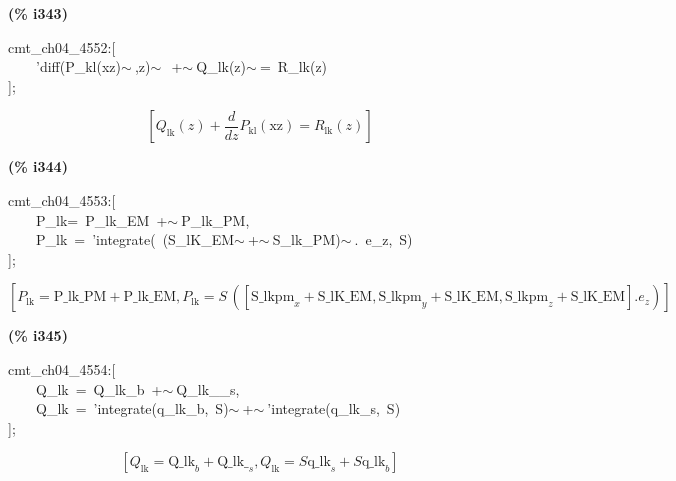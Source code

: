 \documentclass[fleqn]{article}
\begin{document}
\noindent
\begin{minipage}[t]{4.000000em}\color{red}\bfseries
(\% i343)	
\end{minipage}
\begin{minipage}[t]{\textwidth}\color{blue}
cmt\_ch04\_4552:[\\
\ \ \ \ 'diff(P\_kl(xz)\ensuremath{\sim\ },z)\ensuremath{\sim\ }\ +\ensuremath{\sim\ }Q\_lk(z)\ensuremath{\sim\ }=\ R\_lk(z)\\
];
\end{minipage}
\[\displaystyle \tag{\% o343} 
\left[ {Q_{\ensuremath{\mathrm{lk}}}}(z)+\frac{d}{d z} {P_{\ensuremath{\mathrm{kl}}}}\left( \ensuremath{\mathrm{xz}}\right) ={R_{\ensuremath{\mathrm{lk}}}}(z)\right] \mbox{}
\]


\noindent
\begin{minipage}[t]{4.000000em}\color{red}\bfseries
(\% i344)	
\end{minipage}
\begin{minipage}[t]{\textwidth}\color{blue}
cmt\_ch04\_4553:[\\
\ \ \ \ P\_lk=\ P\_lk\_EM\ +\ensuremath{\sim\ }P\_lk\_PM,\ \\
\ \ \ \ P\_lk\ =\ 'integrate(\ (S\_lK\_EM\ensuremath{\sim\ }+\ensuremath{\sim\ }S\_lk\_PM)\ensuremath{\sim\ }.\ e\_z,\ S)\\
];
\end{minipage}
\[\displaystyle \tag{\% o344} 
\operatorname{[}{P_{\ensuremath{\mathrm{lk}}}}=\ensuremath{\mathrm{P\_ lk\_ PM}}+\ensuremath{\mathrm{P\_ lk\_ EM}}\operatorname{,}{P_{\ensuremath{\mathrm{lk}}}}=S\, \left( \left[ {{\ensuremath{\mathrm{S\_ lkpm}}}_x}+\ensuremath{\mathrm{S\_ lK\_ EM}}\operatorname{,}{{\ensuremath{\mathrm{S\_ lkpm}}}_y}+\ensuremath{\mathrm{S\_ lK\_ EM}}\operatorname{,}{{\ensuremath{\mathrm{S\_ lkpm}}}_z}+\ensuremath{\mathrm{S\_ lK\_ EM}}\right] \ensuremath{\mathrm{ . }}{e_z}\right) \operatorname{]}\mbox{}
\]


\noindent
\begin{minipage}[t]{4.000000em}\color{red}\bfseries
(\% i345)	
\end{minipage}
\begin{minipage}[t]{\textwidth}\color{blue}
cmt\_ch04\_4554:[\\
\ \ \ \ Q\_lk\ =\ Q\_lk\_b\ +\ensuremath{\sim\ }Q\_lk\_\_s,\ \\
\ \ \ \ Q\_lk\ =\ 'integrate(q\_lk\_b,\ S)\ensuremath{\sim\ }+\ensuremath{\sim\ }'integrate(q\_lk\_s,\ S)\\
];
\end{minipage}
\[\displaystyle \tag{\% o345} 
\left[ {Q_{\ensuremath{\mathrm{lk}}}}={{\ensuremath{\mathrm{Q\_ lk}}}_b}+{{\ensuremath{\mathrm{Q\_ lk\_ }}}_s}\operatorname{,}{Q_{\ensuremath{\mathrm{lk}}}}=S {{\ensuremath{\mathrm{q\_ lk}}}_s}+S {{\ensuremath{\mathrm{q\_ lk}}}_b}\right] \mbox{}
\]
\end{document}
